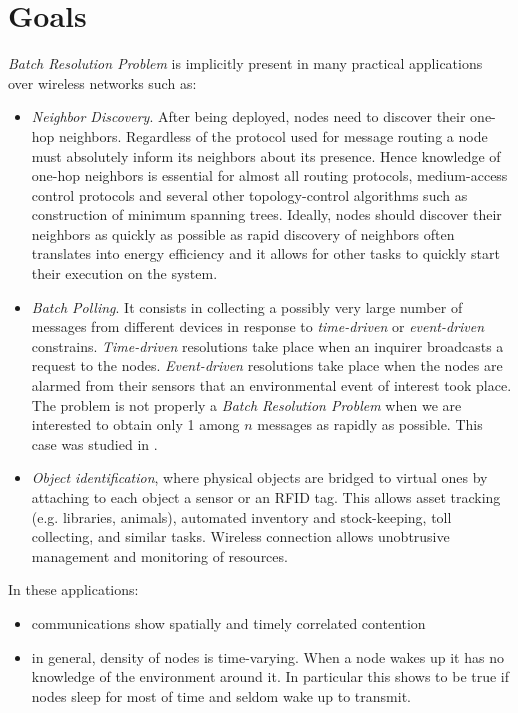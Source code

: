 \documentclass[12pt,a4paper]{report}
\begin{document}
\section{Goals}

\emph{Batch Resolution Problem} is implicitly present in many practical applications over wireless networks such as:
\begin{itemize}
\item \emph{Neighbor Discovery}. After being deployed, nodes need to discover their one-hop neighbors. Regardless of the protocol used for message routing a node must absolutely inform its neighbors about its presence.
Hence knowledge of one-hop neighbors is essential for almost all routing protocols, medium-access control protocols and several other topology-control algorithms such as construction of minimum spanning trees.
Ideally, nodes should discover their neighbors as quickly as possible as rapid discovery of neighbors often translates into energy efficiency and it allows for other tasks to quickly start their execution on the system.
\item \emph{Batch Polling}. It consists in collecting a possibly very large number of messages from different devices in response to \emph{time-driven} or \emph{event-driven} constrains. \emph{Time-driven} resolutions take place when an inquirer broadcasts a request to the nodes. \emph{Event-driven} resolutions take place when the nodes are alarmed from their sensors that an environmental event of interest took place. The problem is not properly a \emph{Batch Resolution Problem} when we are interested to obtain only 1 among $n$ messages as rapidly as possible. This case was studied in \cite{sift}.
\item \emph{Object identification}, where physical objects are bridged to virtual ones by attaching to each object a sensor or an RFID tag. This allows asset tracking (e.g. libraries, animals), automated inventory and stock-keeping, toll collecting, and similar tasks. Wireless connection allows unobtrusive management and monitoring of resources.
\end{itemize}

In these applications:
\begin{itemize}
\item communications show spatially and timely correlated contention
\item in general, density of nodes is time-varying. When a node wakes up it has no knowledge of the environment around it. In particular this shows to be true if nodes sleep for most of time and seldom wake up to transmit.
\end{itemize}
 
\end{document}
